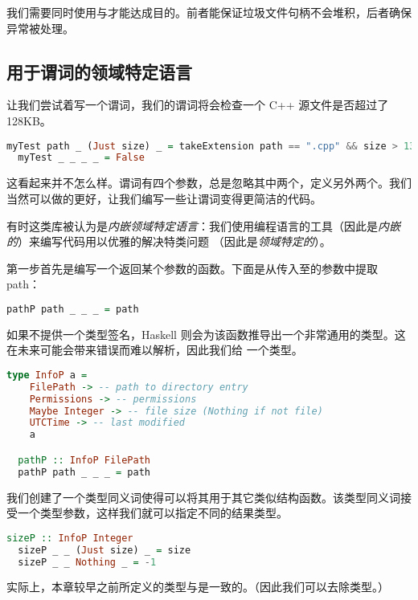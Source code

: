 \documentclass[./main.tex]{subfiles}
\begin{document}
我们需要同时使用与才能达成目的。前者能保证垃圾文件句柄不会堆积，后者确保异常被处理。

\subsection*{用于谓词的领域特定语言}

让我们尝试着写一个谓词，我们的谓词将会检查一个 C++ 源文件是否超过了 128KB。

\begin{lstlisting}[language=Haskell]
  myTest path _ (Just size) _ = takeExtension path == ".cpp" && size > 131072
  myTest _ _ _ _ = False
\end{lstlisting}

这看起来并不怎么样。谓词有四个参数，总是忽略其中两个，定义另外两个。我们当然可以做的更好，让我们编写一些让谓词变得更简洁的代码。

有时这类库被认为是\textit{内嵌领域特定语言}：我们使用编程语言的工具（因此是\textit{内嵌的}）来编写代码用以优雅的解决特类问题
（因此是\textit{领域特定的}）。

第一步首先是编写一个返回某个参数的函数。下面是从传入至的参数中提取 path：

\begin{lstlisting}[language=Haskell]
  pathP path _ _ _ = path
\end{lstlisting}

如果不提供一个类型签名，Haskell 则会为该函数推导出一个非常通用的类型。这在未来可能会带来错误而难以解析，因此我们给
一个类型。

\begin{lstlisting}[language=Haskell]
  type InfoP a =
    FilePath -> -- path to directory entry
    Permissions -> -- permissions
    Maybe Integer -> -- file size (Nothing if not file)
    UTCTime -> -- last modified
    a

  pathP :: InfoP FilePath
  pathP path _ _ _ = path
\end{lstlisting}

我们创建了一个类型同义词使得可以将其用于其它类似结构函数。该类型同义词接受一个类型参数，这样我们就可以指定不同的结果类型。

\begin{lstlisting}[language=Haskell]
  sizeP :: InfoP Integer
  sizeP _ _ (Just size) _ = size
  sizeP _ _ Nothing _ = -1
\end{lstlisting}

实际上，本章较早之前所定义的类型与是一致的。（因此我们可以去除类型。）
\end{document}
